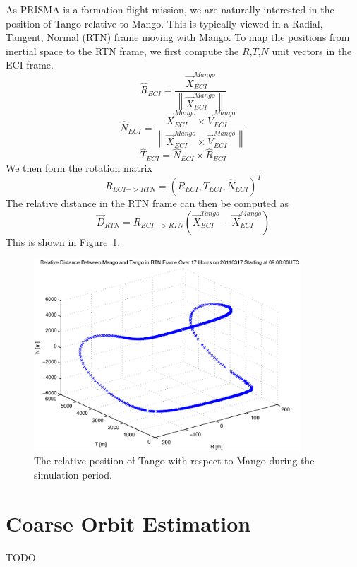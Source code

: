 \documentclass{article}
\newcommand\norm[1]{\left\lVert#1\right\rVert} %
\begin{document}
As PRISMA is a formation flight mission, we are naturally interested in the position of Tango relative to Mango. This is typically viewed in a Radial, Tangent, Normal (RTN) frame moving with Mango. To map the positions from inertial space to the RTN frame, we first compute the $R$,$T$,$N$ unit vectors in the ECI frame. 
\[\hat{R}_{ECI} = \frac{\vec{X}_{ECI}^{Mango}}{\norm{\vec{X}_{ECI}^{Mango}}}\]
\[\hat{N}_{ECI} = \frac{\vec{X}_{ECI}^{Mango} \times \vec{V}_{ECI}^{Mango}}{\norm{\vec{X}_{ECI}^{Mango} \times \vec{V}_{ECI}^{Mango}}} \]
\[\hat{T}_{ECI} = \hat{N}_{ECI} \times \hat{R}_{ECI} \]
We then form the rotation matrix
\[R_{ECI->RTN} = (\hat{R}_{ECI},\hat{T}_{ECI},\hat{N}_{ECI})^T \]
The relative distance in the RTN frame can then be computed as 
\[ \vec{D}_{RTN} = R_{ECI->RTN}(\vec{X}^{Tango}_{ECI} - \vec{X}^{Mango}_{ECI})\]
This is shown in Figure~\ref{fig:RTN}.
\begin{figure}[H]
    \centering
    \includegraphics[width=10cm]{RTN.eps}
    \caption{The relative position of Tango with respect to Mango during the simulation period.}
    \label{fig:RTN}
\end{figure}

\section{Coarse Orbit Estimation}
TODO




\end{document}
